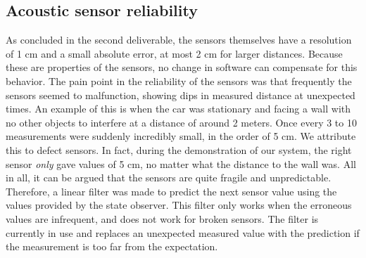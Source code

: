 \documentclass[11pt,titlepage]{report}
\begin{document}
\subsection{Acoustic sensor reliability}
As concluded in the second deliverable, the sensors themselves have a resolution of 1 cm and a small absolute error, at most 2 cm for larger distances. Because these are properties of the sensors, no change in software can compensate for this behavior. The pain point  in the reliability of the sensors was that frequently the sensors seemed to malfunction, showing dips in measured distance at unexpected times. An example of this is when the car was stationary and facing a wall with no other objects to interfere at a distance of around 2 meters. Once every 3 to 10 measurements were suddenly incredibly small, in the order of 5 cm. We attribute this to defect sensors. In fact, during the demonstration of our system, the right sensor \textit{only} gave values of 5 cm, no matter what the distance to the wall was. All in all, it can be argued that the sensors are quite fragile and unpredictable. Therefore, a linear filter was made to predict the next sensor value using the values provided by the state observer. This filter only works when the erroneous values are infrequent, and does not work for broken sensors. The filter is currently in use and replaces an unexpected measured value with the prediction if the measurement is too far from the expectation.
\end{document}
